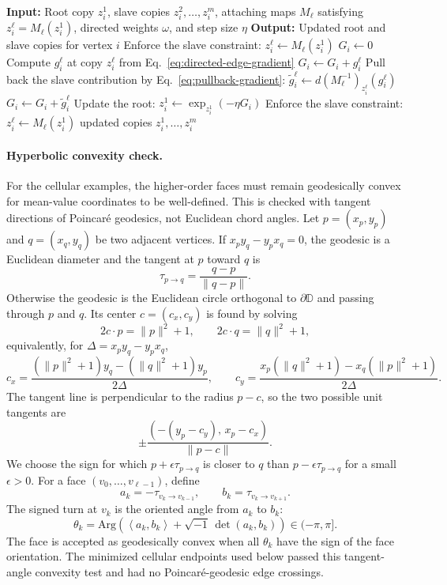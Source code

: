 \documentclass[12pt]{article}
\newcommand{\D}{\mathbb D}
\newcommand{\Arg}{\mathrm {Arg}}
\theoremstyle{definition}
\theoremstyle{remark}
\numberwithin{equation}{section}
\begin{document}
\begin{algorithm}[H]
\caption{Gradient accumulation and update at one root}
\label{alg:root-slave-gradient-accumulation}
\begin{algorithmic}[1]
\State \textbf{Input:} Root copy $z_i^1$, slave copies $z_i^2,\ldots,z_i^m$, attaching maps $M_\ell$ satisfying $z_i^\ell=M_\ell(z_i^1)$, directed weights $\omega$, and step size $\eta$
\State \textbf{Output:} Updated root and slave copies for vertex $i$
    \State Enforce the slave constraint: $z_i^\ell\gets M_\ell(z_i^1)$
\EndFor
\State $G_i\gets 0$
    \State Compute $g_i^\ell$ at copy $z_i^\ell$ from Eq.~\eqref{eq:directed-edge-gradient}
        \State $G_i\gets G_i+g_i^\ell$ 
    \Else
        \State Pull back the slave contribution by Eq.~\eqref{eq:pullback-gradient}: $\widetilde g_i^\ell\gets d(M_\ell^{-1})_{z_i^\ell}(g_i^\ell)$
        \State $G_i\gets G_i+\widetilde g_i^\ell$
    \EndIf
\EndFor
{}
    \State Update the root: $z_i^1\gets \exp_{z_i^1}(-\eta G_i)$
\EndIf
{}
    \State Enforce the slave constraint: $z_i^\ell\gets M_\ell(z_i^1)$
\EndFor
\State \Return updated copies $z_i^1,\ldots,z_i^m$
\end{algorithmic}
\end{algorithm}

\paragraph{Hyperbolic convexity check.}
For the cellular examples, the higher-order faces must remain geodesically convex for mean-value coordinates to be well-defined. This is checked with tangent directions of Poincaré geodesics, not Euclidean chord angles. Let $p=(x_p,y_p)$ and $q=(x_q,y_q)$ be two adjacent vertices. If $x_p y_q-y_p x_q=0$, the geodesic is a Euclidean diameter and the tangent at $p$ toward $q$ is
\[
\tau_{p\to q} = \frac{q-p}{\|q-p\|}.
\]
Otherwise the geodesic is the Euclidean circle orthogonal to $\partial\D$ and passing through $p$ and $q$. Its center $c=(c_x,c_y)$ is found by solving
\[
2c\cdot p=\|p\|^2+1,\qquad 2c\cdot q=\|q\|^2+1,
\]
equivalently, for $\Delta=x_p y_q-y_p x_q$,
\[
c_x = \frac{(\|p\|^2+1)y_q-(\|q\|^2+1)y_p}{2\Delta}, \qquad c_y = \frac{x_p(\|q\|^2+1)-x_q(\|p\|^2+1)}{2\Delta}.
\]
The tangent line is perpendicular to the radius $p-c$, so the two possible unit tangents are
\[
\pm\frac{(-(y_p-c_y),\,x_p-c_x)}{\|p-c\|}.
\]
We choose the sign for which $p+\epsilon\tau_{p\to q}$ is closer to $q$ than $p-\epsilon\tau_{p\to q}$ for a small $\epsilon>0$. For a face $(v_0,\ldots,v_{\ell-1})$, define
\[
a_k=-\tau_{v_k\to v_{k-1}}, \qquad b_k=\tau_{v_k\to v_{k+1}}.
\]
The signed turn at $v_k$ is the oriented angle from $a_k$ to $b_k$:
\[
\theta_k = \Arg\!\left( \left\langle a_k,b_k\right\rangle + \sqrt{-1}\,\det(a_k,b_k) \right)\in(-\pi,\pi].
\]
The face is accepted as geodesically convex when all $\theta_k$ have the sign of the face orientation. The minimized cellular endpoints used below passed this tangent-angle convexity test and had no Poincaré-geodesic edge crossings.
\end{document}
